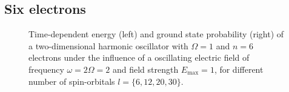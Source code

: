 \subsection*{Six electrons}

\begin{figure}[!h]
    \centering
    \caption{Time-dependent energy (left) and ground state probability (right)
        of a two-dimensional harmonic oscillator with $\Omega=1$
        and $n=6$ electrons under the influence of a oscillating electric field 
        of frequency $\omega = 2 \Omega = 2$ and field strength $E_\text{max}=1$,
        for different number of spin-orbitals $l=\{6,12,20,30\}$.
    }
    \label{fig:2d_n6_qd}
\end{figure}
